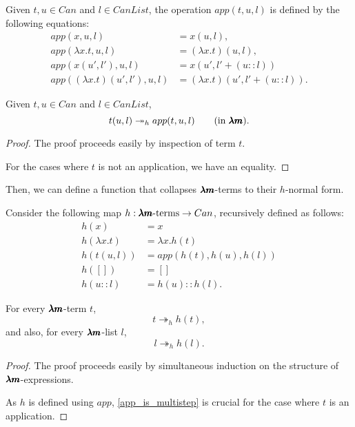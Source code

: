 \begin{definition}
  Given $t, u \in Can$ and $l \in CanList$, the operation $app(t, u, l)$ is defined by the following equations:
  \begin{align*}
    app(x, u, l)                      &= x(u, l), \\
    app(\lambda x. t, u, l)           &= (\lambda x. t)(u, l), \\ 
    app(x(u', l'), u, l)              &= x(u', l' + (u::l)) \\
    app((\lambda x. t)(u', l'), u, l) &= (\lambda x. t)(u', l'+(u::l)).
  \end{align*}  
\end{definition}

\begin{lemma}
  \label{app_is_multistep}
  Given $t, u \in Can$ and $l \in CanList$, 
  \[ t(u, l) \twoheadrightarrow_h app(t, u, l) \qquad \text{(in $\pmb{\lambda m}$)}. \]
\end{lemma}
\begin{proof}
  The proof proceeds easily by inspection of term $t$.

  For the cases where $t$ is not an application, we have an equality.
\end{proof}

Then, we can define a function that collapses $\pmb{\lambda m}$-terms to their $h$-normal form.

\begin{definition}
  Consider the following map $h : \pmb{\lambda m} \text{-terms} \to Can$, recursively defined as follows:
  \begin{align*}
    h(x)            &= x \\
    h(\lambda x. t) &= \lambda x . h(t) \\
    h(t(u,l))       &= app(h(t), h(u), h(l)) \\
    h([])           &= [] \\
    h(u::l)         &= h(u)::h(l).
  \end{align*}
\end{definition}

\begin{proposition}
  \label{h_is_multistep}
  For every $\pmb{\lambda m}$-term $t$, \[ t \twoheadrightarrow_h h(t), \]
  and also, for every $\pmb{\lambda m}$-list $l$, \[ l \twoheadrightarrow_h h(l). \]
\end{proposition}
\begin{proof}
  The proof proceeds easily by simultaneous induction on the structure of $\pmb{\lambda m}$-expressions.

  As $h$ is defined using $app$, \cref{app_is_multistep} is crucial for the case where $t$ is an application. 
\end{proof}

